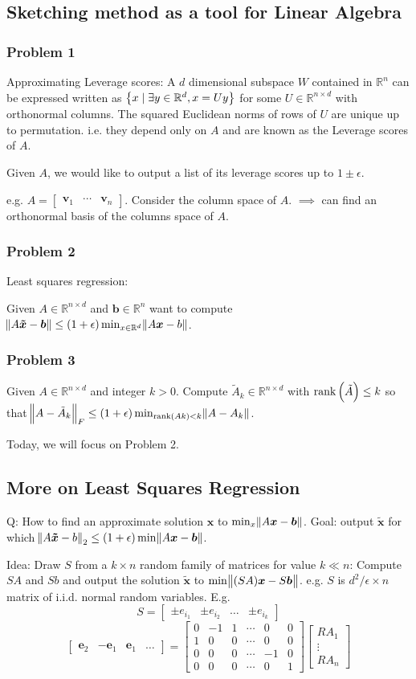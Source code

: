 \documentclass{article}
\DeclareMathOperator{\rank}{rank}
\newcommand{\m}[1]{\begin{bmatrix} #1 \end{bmatrix}}
\newcommand{\RR}{\mathbb{R}}
\begin{document}
\subsection{Sketching method as a tool for Linear Algebra}
\subsubsection{Problem 1}
Approximating Leverage scores:
A \(d\) dimensional subspace \(W\) contained in \(\RR^n\) can be expressed written as \(\set{x \mid \exists y \in \RR^d, x = Uy}\)
for some \(U \in \RR^{n \times d}\) with orthonormal columns.
The squared Euclidean norms of rows of \(U\) are unique up to permutation.
i.e. they depend only on \(A\) and are known as the Leverage scores of \(A\).

Given \(A\), we would like to output a list of its leverage scores up to \(1 \pm \epsilon\).

e.g. \(A = \m{\bm v_1 & \cdots & \bm v_n}\).
Consider the column space of \(A\).
\(\implies\) can find an orthonormal basis of the columns space of \(A\).

\subsubsection{Problem 2}
Least squares regression:

Given \(A \in \RR^{n \times d}\) and \(\bm b\in \RR^n\) want to compute \(\norm{A \bm{\tilde x} -\bm b} \le (1 + \epsilon)\min_{x \in \RR^d}\norm{A\bm x - b}\).

\subsubsection{Problem 3}
Given \(A \in \RR^{n \times d}\) and integer \(k > 0\).
Compute \(\tilde A_k \in \RR^{n \times d}\) with \(\rank \del{\tilde A} \leq k\) so that \(\norm{A - \tilde A_k}_F \leq (1 + \epsilon)\min_{\rank(Ak) < k}\norm{A - A_k}\).

Today, we will focus on Problem 2.

\subsection{More on Least Squares Regression}
Q: How to find an approximate solution \(\bm x\) to \(\min_x \norm{A\bm x - \bm b}\).
Goal: output \(\bm{\tilde x}\) for which \(\norm{A\bm{\tilde x} - b}_2 \leq (1 + \epsilon)\min \norm{A\bm x - \bm b}\).

Idea: Draw \(S\) from a \(k \times n\) random family of matrices for value \(k \ll n\):
Compute \(SA \) and \(Sb\) and output the solution \(\bm{\tilde x}\) to \(\min\norm{(SA)\bm x - S\bm b}\).
e.g. \(S\) is \(d^2/\epsilon \times n\) matrix of i.i.d. normal random variables.
E.g. \[S = \m{\pm e_{i_1}&\pm e_{i_2}&  \dots &\pm e_{i_k}}\]
\[\m{\bm e_2 & -\bm e_1 & \bm e_1 & \dots} = \m{0 & -1 & 1 &\cdots& 0 & 0\\1 & 0 & 0 & \cdots & 0 & 0\\ 0 & 0 & 0 & \cdots & -1 & 0\\ 0 & 0 & 0 & \cdots & 0 & 1}\m{RA_1 \\\vdots \\ RA_n}\]
\end{document}
